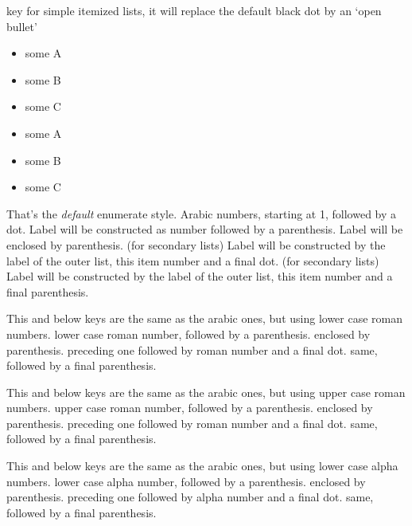 \documentclass[article,nofontwarning,nogeometry,english,tocdepth=3,secdepth=3]{ufrgscca} %
\begin{document}
\begin{describelist}{key}
	 {for simple itemized lists, it will replace the default black dot by an `open bullet'}

	\begin{codestore}[st=enumD]
	\begin{itemize}[tcc,miditemsep]
		\item some A
		\item some B
		\item some C
	\end{itemize}
	\begin{itemize}[tcc,bullet,miditemsep]
		\item some A
		\item some B
		\item some C
	\end{itemize}
\end{codestore}



	 {That's the \emph{default} enumerate style. Arabic numbers, starting at 1, followed by a dot.}
	 {Label will be constructed as number followed by a parenthesis.}
	 {Label will be enclosed by parenthesis.}
	 {(for secondary lists) Label will be constructed by the label of the outer list, this item number and a final dot.}
	 {(for secondary lists) Label will be constructed by the label of the outer list, this item number and a final parenthesis.}

	 {This and below keys are the same as the arabic ones, but using lower case roman numbers.}
	 {lower case roman number, followed by a parenthesis.}
	 {enclosed by parenthesis.}
	 {preceding one followed by roman number and a final dot.}
	 {same, followed by a final parenthesis.}

	 {This and below keys are the same as the arabic ones, but using upper case roman numbers.}
	 {upper case roman number, followed by a parenthesis.}
	 {enclosed by parenthesis.}
	 {preceding one followed by roman number and a final dot.}
	 {same, followed by a final parenthesis.}

	 {This and below keys are the same as the arabic ones, but using lower case alpha numbers.}
	 {lower case alpha number, followed by a parenthesis.}
	 {enclosed by parenthesis.}
	 {preceding one followed by alpha number and a final dot.}
	 {same, followed by a final parenthesis.}


\end{describelist}
\end{document}
